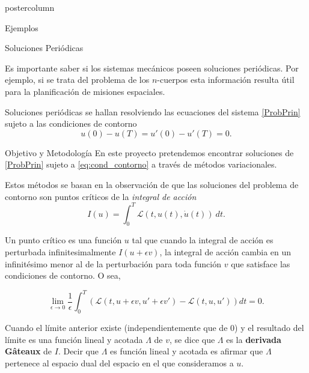 \documentclass[final,hyperref={pdfpagelabels=false}]{beamer}
\begin{document}
\begin{frame}
\begin{columns}
\begin{column}{.49\textwidth}
\begin{beamercolorbox}[center,wd=\textwidth]{postercolumn}
\begin{minipage}[T]{.95\textwidth}
{\begin{block}{Ejemplos}
\begin{itemize}
 \end{itemize}

\end{block}


  \begin{block}{Soluciones Periódicas}

  Es importante saber si los sistemas mecánicos poseen soluciones periódicas. 
	Por ejemplo, si se trata del problema de los $n$-cuerpos esta información resulta útil para la planificación de misiones espaciales.

  Soluciones periódicas se hallan resolviendo las ecuaciones del sistema \eqref{ProbPrin} sujeto a las condiciones de contorno
  \begin{equation}\label{eq:cond_contorno} u(0)-u(T)=u'(0)-u'(T)=0.\end{equation}

    \end{block}











  \begin{block}{Objetivo y Metodología}
  En este proyecto pretendemos encontrar soluciones de \eqref{ProbPrin} sujeto a  \eqref{eq:cond_contorno} a través de métodos variacionales.

  Estos métodos se basan en la observación de que las soluciones del problema de contorno
  son puntos críticos de la \emph{integral de acción}
              \begin{equation}\label{integral_accion}
                I(u)=\int_{0}^T \mathcal{L}(t,u(t),\dot{u}(t))\ dt.
              \end{equation}

  Un punto crítico es una función $u$ tal que cuando la integral de acción es perturbada infinitesimalmente $I(u+\epsilon v)$, la integral de acción cambia en un infinitésimo menor al de la perturbación para toda función $v$ que satisface las condiciones de contorno. O sea, 

  \begin{equation}
   \lim_{\epsilon\to 0}\frac{1}{\epsilon}\int_0^T(\mathcal{L}(t,u+\epsilon v,u'+\epsilon v')-\mathcal{L}(t,u,u'))dt=0.
  \end{equation}

Cuando el límite anterior existe (independientemente que de 0) y el resultado del límite es una función lineal y acotada $\Lambda$ de $v$, se dice que $\Lambda$ es la  \textbf{derivada G\^ateaux} de $I$. Decir que $\Lambda$ es función lineal y acotada  es afirmar que $\Lambda$ pertenece al espacio dual del espacio en el que consideramos a $u$.


\end{block}}
\end{minipage}
\end{beamercolorbox}
\end{column}
\end{columns}
\end{frame}
\end{document}
